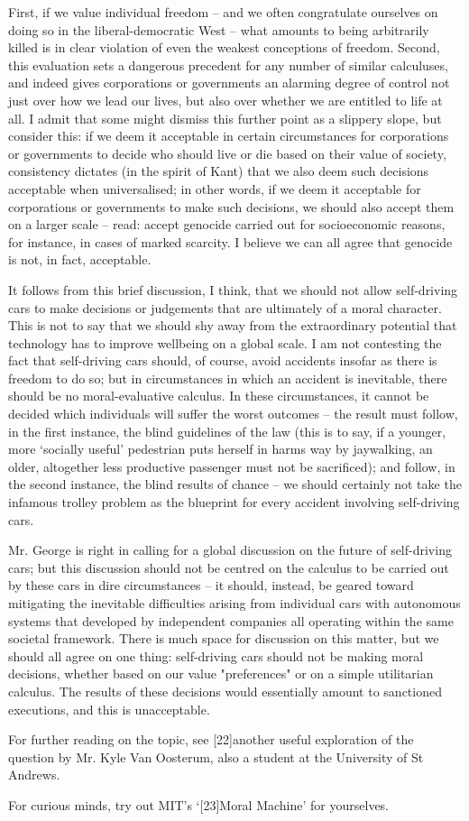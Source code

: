    First, if we value individual freedom -- and we often congratulate
   ourselves on doing so in the liberal-democratic West -- what amounts to
   being arbitrarily killed is in clear violation of even the weakest
   conceptions of freedom. Second, this evaluation sets a dangerous
   precedent for any number of similar calculuses, and indeed gives
   corporations or governments an alarming degree of control not just over
   how we lead our lives, but also over whether we are entitled to life at
   all. I admit that some might dismiss this further point as a slippery
   slope, but consider this: if we deem it acceptable in certain
   circumstances for corporations or governments to decide who should live
   or die based on their value of society, consistency dictates (in the
   spirit of Kant) that we also deem such decisions acceptable when
   universalised; in other words, if we deem it acceptable for
   corporations or governments to make such decisions, we should also
   accept them on a larger scale -- read: accept genocide carried out for
   socioeconomic reasons, for instance, in cases of marked scarcity. I
   believe we can all agree that genocide is not, in fact, acceptable.

   It follows from this brief discussion, I think, that we should not
   allow self-driving cars to make decisions or judgements that are
   ultimately of a moral character. This is not to say that we should shy
   away from the extraordinary potential that technology has to improve
   wellbeing on a global scale. I am not contesting the fact that
   self-driving cars should, of course, avoid accidents insofar as there
   is freedom to do so; but in circumstances in which an accident is
   inevitable, there should be no moral-evaluative calculus. In these
   circumstances, it cannot be decided which individuals will suffer the
   worst outcomes -- the result must follow, in the first instance, the
   blind guidelines of the law (this is to say, if a younger, more
   `socially useful' pedestrian puts herself in harms way by jaywalking,
   an older, altogether less productive passenger must not be sacrificed);
   and follow, in the second instance, the blind results of chance -- we
   should certainly not take the infamous trolley problem as the blueprint
   for every accident involving self-driving cars.

   Mr. George is right in calling for a global discussion on the future of
   self-driving cars; but this discussion should not be centred on the
   calculus to be carried out by these cars in dire circumstances -- it
   should, instead, be geared toward mitigating the inevitable
   difficulties arising from individual cars with autonomous systems that
   developed by independent companies all operating within the same
   societal framework. There is much space for discussion on this matter,
   but we should all agree on one thing: self-driving cars should not be
   making moral decisions, whether based on our value "preferences" or on
   a simple utilitarian calculus. The results of these decisions would
   essentially amount to sanctioned executions, and this is unacceptable.

   For further reading on the topic, see [22]another useful exploration of
   the question by Mr. Kyle Van Oosterum, also a student at the University
   of St Andrews.

   For curious minds, try out MIT's `[23]Moral Machine' for yourselves.

